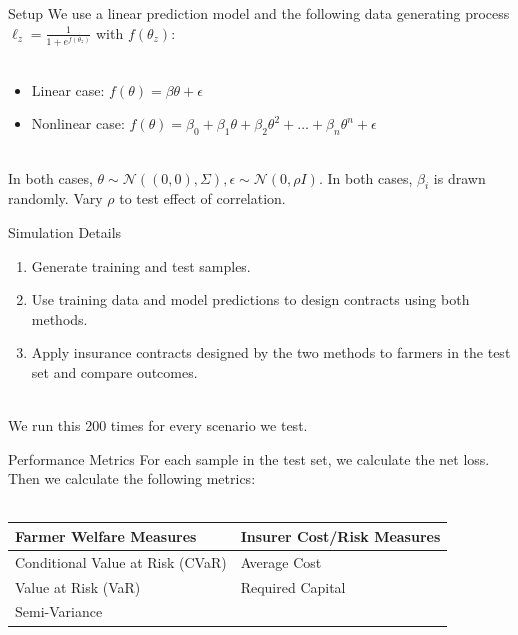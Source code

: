 \documentclass{beamer}
\begin{document}
\begin{frame}{Setup}
    We use a linear prediction model and the following data generating process $\ell_z = \frac{1}{1+e^{f(\theta_z)}}$ with $f(\theta_z)$:
    \\~~\\  
      \begin{itemize}
        \item Linear case: $f(\theta) = \beta \theta + \epsilon$
        \item Nonlinear case: $f(\theta) = \beta_0 + \beta_1 \theta + \beta_2 \theta^2 + \ldots + \beta_n \theta^n+ \epsilon$
      \end{itemize}~\\
      In both cases, $\theta \sim \mathcal{N}((0,0),\Sigma), \epsilon \sim \mathcal{N}(0,\rho I)$. In both cases, $\beta_i$ is drawn randomly. Vary $\rho$ to test effect of correlation.
\end{frame}

\begin{frame}{Simulation Details}
    \begin{enumerate}
        \setlength\itemsep{2em}
        \item Generate training and test samples.
        \item Use training data and model predictions to design contracts using both methods.  
        \item Apply insurance contracts designed by the two methods to farmers in the test set and compare outcomes.
        \end{enumerate}~\\
    We run this 200 times for every scenario we test. 
\end{frame}

\begin{frame}{Performance Metrics}
    For each sample in the test set, we calculate the net loss. Then we calculate the following metrics: 
    \\~~\\
    \begin{table}
        \centering
        \begin{tabular}{|l|l|}
            \hline
            \textbf{Farmer Welfare Measures} & \textbf{Insurer Cost/Risk Measures} \\ \hline
            Conditional Value at Risk (CVaR) & Average Cost                        \\
            Value at Risk (VaR)              & Required Capital                    \\
            Semi-Variance                    &                                     \\ \hline
            \end{tabular}
    \end{table}
\end{frame}
\end{document}
